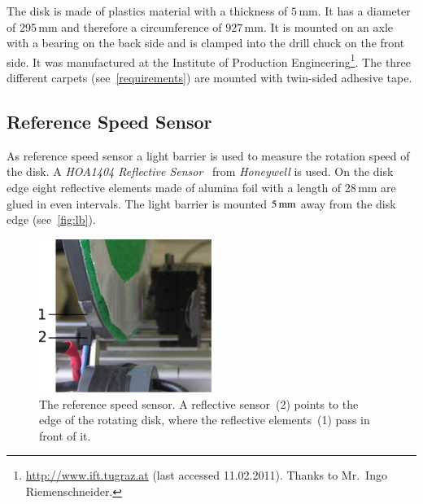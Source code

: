 \documentclass[12pt,a4paper]{article}
\newcommand{\mm}[1]{$\unit[#1]{mm}$}
\begin{document}
The disk is made of plastics material with a thickness of $5\,$mm.
It has a diameter of 295\,mm and therefore a circumference of $927\,$mm.
It is mounted on an axle with a bearing on the back side and is clamped into the drill chuck on the front side.
It was manufactured at the Institute of Production Engineering\footnote{\url{http://www.ift.tugraz.at} (last accessed 11.02.2011). Thanks to Mr.\ Ingo Riemenschneider.}.
The three different carpets (see~\autoref{requirements}) are mounted with twin-sided adhesive tape.

\subsection{Reference Speed Sensor}
\label{lb}

As reference speed sensor a light barrier is used to measure the rotation speed of the disk.
A \emph{HOA1404 Reflective Sensor}~\cite{hoa} from \emph{Honeywell} is used.
On the disk edge eight reflective elements made of alumina foil with a length of 28\,mm are glued in even intervals.
The light barrier is mounted \mm{5} away from the disk edge (see~\autoref{fig:lb}).

\begin{figure}[htbp]
\begin{center}
\includegraphics[width=0.5\textwidth]{figures/light_barrier.pdf}
\caption{\label{fig:lb}
The reference speed sensor.
A reflective sensor~(2) points to the edge of the rotating disk, where the reflective elements~(1) pass in front of it.
}
\end{center}
\end{figure}
\end{document}
